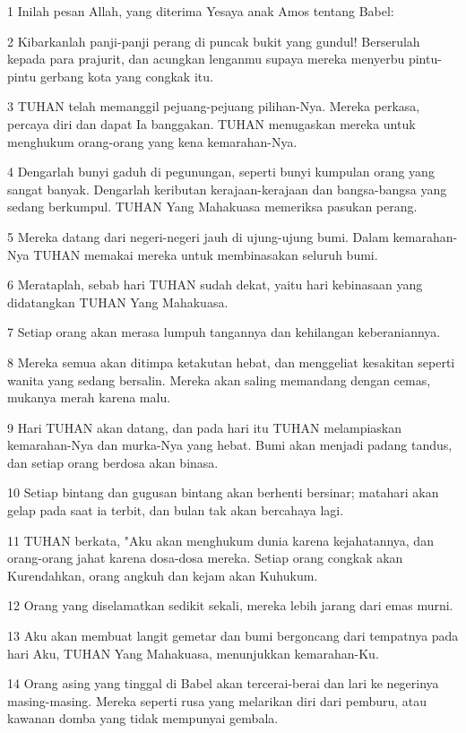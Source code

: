\par 1 Inilah pesan Allah, yang diterima Yesaya anak Amos tentang Babel:
\par 2 Kibarkanlah panji-panji perang di puncak bukit yang gundul! Berserulah kepada para prajurit, dan acungkan lenganmu supaya mereka menyerbu pintu-pintu gerbang kota yang congkak itu.
\par 3 TUHAN telah memanggil pejuang-pejuang pilihan-Nya. Mereka perkasa, percaya diri dan dapat Ia banggakan. TUHAN menugaskan mereka untuk menghukum orang-orang yang kena kemarahan-Nya.
\par 4 Dengarlah bunyi gaduh di pegunungan, seperti bunyi kumpulan orang yang sangat banyak. Dengarlah keributan kerajaan-kerajaan dan bangsa-bangsa yang sedang berkumpul. TUHAN Yang Mahakuasa memeriksa pasukan perang.
\par 5 Mereka datang dari negeri-negeri jauh di ujung-ujung bumi. Dalam kemarahan-Nya TUHAN memakai mereka untuk membinasakan seluruh bumi.
\par 6 Merataplah, sebab hari TUHAN sudah dekat, yaitu hari kebinasaan yang didatangkan TUHAN Yang Mahakuasa.
\par 7 Setiap orang akan merasa lumpuh tangannya dan kehilangan keberaniannya.
\par 8 Mereka semua akan ditimpa ketakutan hebat, dan menggeliat kesakitan seperti wanita yang sedang bersalin. Mereka akan saling memandang dengan cemas, mukanya merah karena malu.
\par 9 Hari TUHAN akan datang, dan pada hari itu TUHAN melampiaskan kemarahan-Nya dan murka-Nya yang hebat. Bumi akan menjadi padang tandus, dan setiap orang berdosa akan binasa.
\par 10 Setiap bintang dan gugusan bintang akan berhenti bersinar; matahari akan gelap pada saat ia terbit, dan bulan tak akan bercahaya lagi.
\par 11 TUHAN berkata, "Aku akan menghukum dunia karena kejahatannya, dan orang-orang jahat karena dosa-dosa mereka. Setiap orang congkak akan Kurendahkan, orang angkuh dan kejam akan Kuhukum.
\par 12 Orang yang diselamatkan sedikit sekali, mereka lebih jarang dari emas murni.
\par 13 Aku akan membuat langit gemetar dan bumi bergoncang dari tempatnya pada hari Aku, TUHAN Yang Mahakuasa, menunjukkan kemarahan-Ku.
\par 14 Orang asing yang tinggal di Babel akan tercerai-berai dan lari ke negerinya masing-masing. Mereka seperti rusa yang melarikan diri dari pemburu, atau kawanan domba yang tidak mempunyai gembala.
